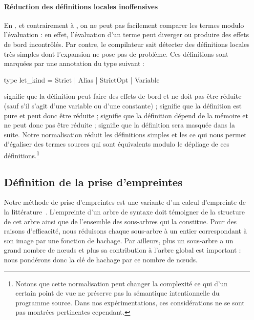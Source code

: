 \paragraph{Réduction des définitions locales inoffensives}

En {\OCaml}, et contrairement à {\Coq}, on ne peut pas facilement
comparer les termes modulo l'évaluation : en effet, l'évaluation d'un
terme peut diverger ou produire des effets de bord incontrôlés.
%
Par contre, le compilateur sait détecter des définitions locales
très simples dont l'expansion ne pose pas de problème. Ces définitions
sont marquées par une annotation du type suivant :

\begin{ocaml}
type let_kind = Strict | Alias | StrictOpt | Variable
\end{ocaml}

\noindent {} signifie que la définition peut faire
des effets de bord et ne doit pas être réduite (sauf s'il s'agit d'une
variable ou d'une constante) ;  signifie que la
définition est pure et peut donc être réduite ; 
signifie que la définition dépend de la mémoire et ne peut donc pas
être réduite ;  signifie que la définition sera
masquée dans la suite. Notre normalisation réduit les
définitions  simples et les  ce qui
nous permet d'égaliser des termes sources qui sont équivalents modulo
le dépliage de ces définitions.\footnote{Notons que cette normalisation
peut changer la complexité ce qui d'un certain point de vue ne préserve
pas la sémantique intentionnelle du programme source. Dans nos
expérimentations, ces considérations ne se sont pas montrées pertinentes
cependant.}

\subsection{Définition de la prise d'empreintes}
\label{sec:fingerprint}

Notre méthode de prise d'empreintes est une variante d'un calcul
d'empreinte de la littérature~\cite{chilowicz:hal-00627811}.
%
L'empreinte d'un arbre de syntaxe doit témoigner de la structure de
cet arbre ainsi que de l'ensemble des sous-arbres qui la constitue. Pour
des raisons d'efficacité, nous réduisons chaque sous-arbre à un entier
correspondant à son image par une fonction de hachage. Par ailleurs,
plus un sous-arbre a un grand nombre de n{\oe}uds et plus sa
contribution à l'arbre global est important : nous pondérons donc
la clé de hachage par ce nombre de n{\oe}uds.

